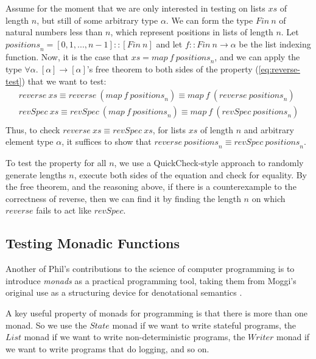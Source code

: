 \documentclass{llncs}
\begin{document}
Assume for the moment that we are only interested in testing on lists
$\mathit{xs}$ of length $n$, but still of some arbitrary type
$\alpha$. We can form the type $\mathit{Fin}~n$ of natural numbers
less than $n$, which represent positions in lists of length $n$. Let
$\mathit{positions}_n = [0, 1, ..., n-1] :: [\mathit{Fin}~n]$ and let
$f :: \mathit{Fin}~n \to \alpha$ be the list indexing function. Now,
it is the case that $\mathit{xs} = \mathit{map}~f~\mathit{positions}_n$,
and we can apply the type $\forall \alpha.~[\alpha] \to [\alpha]$'s
free theorem to both sides of the property (\ref{eq:reverse-test})
that we want to test:
\begin{displaymath}
  \begin{array}{l}
    \mathit{reverse}~\mathit{xs} \equiv \mathit{reverse}~(\mathit{map}~f~\mathit{positions}_n) \equiv \mathit{map}~f~(\mathit{reverse}~\mathit{positions}_n) \\
    \mathit{revSpec}~\mathit{xs} \equiv \mathit{revSpec}~(\mathit{map}~f~\mathit{positions}_n) \equiv \mathit{map}~f~(\mathit{revSpec}~\mathit{positions}_n) \\
  \end{array}
\end{displaymath}
Thus, to check
$\mathit{reverse}~\mathit{xs} \equiv \mathit{revSpec}~\mathit{xs}$,
for lists $\mathit{xs}$ of length $n$ and arbitrary element type
$\alpha$, it suffices to show that
$\mathit{reverse}~\mathit{positions}_n \equiv
\mathit{revSpec}~\mathit{positions}_n$.

To test the property for all $n$, we use a QuickCheck-style approach
to randomly generate lengths $n$, execute both sides of the equation
and check for equality. By the free theorem, and the reasoning above,
if there is a counterexample to the correctness of reverse, then we
can find it by finding the length $n$ on which $\mathit{reverse}$
fails to act like $\mathit{revSpec}$.

\subsection{Testing Monadic Functions}

Another of Phil's contributions to the science of computer programming
is to introduce \emph{monads} as a practical programming tool, taking
them from Moggi's original use as a structuring device for
denotational semantics \cite{DBLP:conf/lics/Moggi89}.

A key useful property of monads for programming is that there is more
than one monad. So we use the $\mathit{State}$ monad if we want to
write stateful programs, the $\mathit{List}$ monad if we want to write
non-deterministic programs, the $\mathit{Writer}$ monad if we want to
write programs that do logging, and so on.
\end{document}
